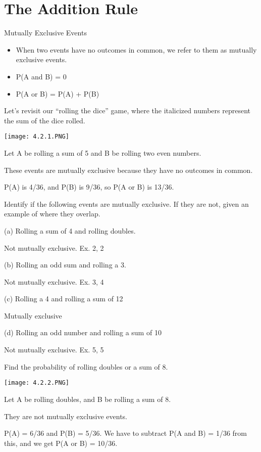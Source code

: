 \documentclass[../stats.tex]{subfiles}
\begin{document}
\section{The Addition Rule}
Mutually Exclusive Events 
\begin{itemize}
    \item When two events have no outcomes in common, we refer to them as mutually exclusive events.
    \item P(A and B) = 0
    \item P(A or B) = P(A) + P(B)
\end{itemize}

\begin{example}
    Let's revisit our ``rolling the dice'' game, where the italicized numbers represent the sum of the dice rolled.
    \begin{center}
        \texttt{[image: 4.2.1.PNG]}
    \end{center}
    Let A be rolling a sum of 5 and B be rolling two even numbers.

    These events are mutually exclusive because they have no outcomes in common.

    P(A) is 4/36, and P(B) is 9/36, so P(A or B) is 13/36.    
\end{example}

\begin{example}
    Identify if the following events are mutually exclusive. If they are not, given an example of where they overlap.

    (a) Rolling a sum of 4 and rolling doubles.

    Not mutually exclusive. Ex. 2, 2

    (b) Rolling an odd sum and rolling a 3.

    Not mutually exclusive. Ex. 3, 4

    (c) Rolling a 4 and rolling a sum of 12

    Mutually exclusive

    (d) Rolling an odd number and rolling a sum of 10 

    Not mutually exclusive. Ex. 5, 5
\end{example}

\begin{example}
    Find the probability of rolling doubles or a sum of 8.
    \begin{center}
        \texttt{[image: 4.2.2.PNG]}
    \end{center}

    Let A be rolling doubles, and B be rolling a sum of 8.

    They are not mutually exclusive events.

    P(A) = 6/36 and P(B) = 5/36. We have to subtract P(A and B) = 1/36 from this, and we get P(A or B) = 10/36.
\end{example}
\end{document}
